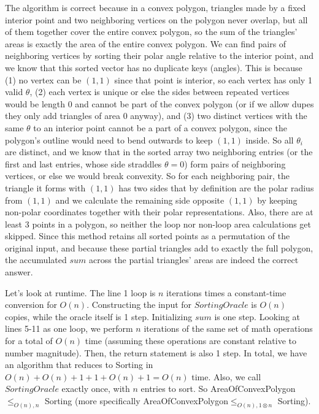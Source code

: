 \documentclass[11pt]{article}
\begin{document}
\begin{enumerate}
\begin{enumerate}
\begin{mysolution}
        \qquad The algorithm is correct because in a convex polygon, triangles made by a fixed interior point and two neighboring vertices on the polygon never overlap, but all of them together cover the entire convex polygon, so the sum of the triangles' areas is exactly the area of the entire convex polygon. We can find pairs of neighboring vertices by sorting their polar angle relative to the interior point, and we know that this sorted vector has no duplicate keys (angles). This is because (1) no vertex can be $(1,1)$ since that point is interior, so each vertex has only 1 valid $\theta$, (2) each vertex is unique or else the sides between repeated vertices would be length 0 and cannot be part of the convex polygon (or if we allow dupes they only add triangles of area 0 anyway), and (3) two distinct vertices with the same $\theta$ to an interior point cannot be a part of a convex polygon, since the polygon's outline would need to bend outwards to keep $(1,1)$ inside. So all $\theta_i$ are distinct, and we know that in the sorted array two neighboring entries (or the first and last entries, whose side straddles $\theta=0$) form pairs of neighboring vertices, or else we would break convexity. So for each neighboring pair, the triangle it forms with $(1,1)$ has two sides that by definition are the polar radius from $(1,1)$ and we calculate the remaining side opposite $(1,1)$ by keeping non-polar coordinates together with their polar representations. Also, there are at least 3 points in a polygon, so neither the loop nor non-loop area calculations get skipped. Since this method retains all sorted points as a permutation of the original input, and because these partial triangles add to exactly the full polygon, the accumulated $sum$ across the partial triangles' areas are indeed the correct answer.
        
        \bigskip
        
        \qquad Let's look at runtime. The line 1 loop is $n$ iterations times a constant-time conversion for $O(n)$. Constructing the input for $SortingOracle$ is $O(n)$ copies, while the oracle itself is 1 step. Initializing $sum$ is one step. Looking at lines 5-11 as one loop, we perform $n$ iterations of the same set of math operations for a total of $O(n)$ time (assuming these operations are constant relative to number magnitude). Then, the  return statement is also 1 step. In total, we have an algorithm that reduces to Sorting in $O(n)+O(n)+1+1+O(n)+1=O(n)$ time. Also, we call $SortingOracle$ exactly once, with $n$ entries to sort. So AreaOfConvexPolygon$\leq_{O(n),n}$ Sorting (more specifically AreaOfConvexPolygon$\leq_{O(n),1\otimes n}$ Sorting).
        \end{mysolution}



\end{enumerate}
\end{enumerate}
\end{document}

